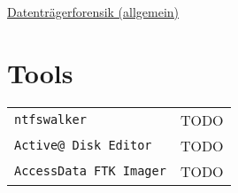 \raggedright
\footnotesize
\begin{multicols}{3}	
	\setlength{\premulticols}{1pt}
	\setlength{\postmulticols}{1pt}
	\setlength{\multicolsep}{1pt}
	\setlength{\columnsep}{2pt}

\begin{center}
     \Large{\underline{Datenträgerforensik (allgemein)}} \\
\end{center}

\section{Tools}
\begin{tabular}{@{}p{\the\MyLen}
		@{}p{\linewidth-\the\MyLen}@{}}
	\texttt{ntfswalker} &  TODO\\
	\texttt{Active@ Disk Editor} &  TODO\\
	\texttt{AccessData FTK Imager} &  TODO\\
\end{tabular}
\end{multicols}